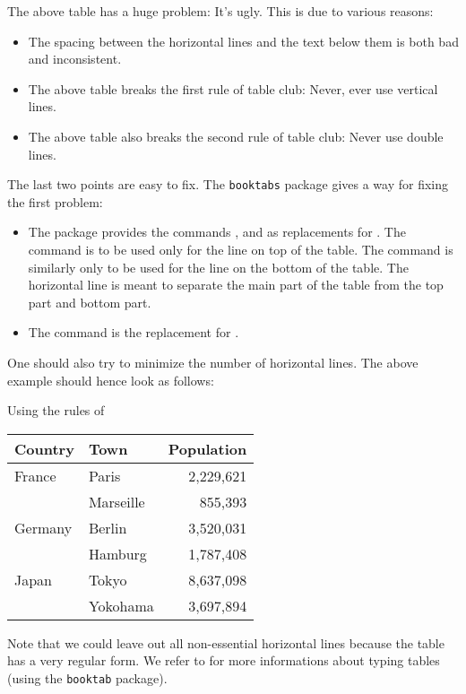 The above table has a huge problem:
It’s ugly.
This is due to various reasons:
\begin{itemize}
  \item
    The spacing between the horizontal lines and the text below them is both bad and inconsistent.
  \item
    The above table breaks the first rule of table club:
    Never, ever use vertical lines.
  \item
    The above table also breaks the second rule of table club:
    Never use double lines.
\end{itemize}
The last two points are easy to fix.
The \texttt{booktabs} package gives a way for fixing the first problem:
\begin{itemize}
  \item
    The package provides the commands ,  and  as replacements for .
    The command  is to be used only for the line on top of the table.
    The command  is similarly only to be used for the line on the bottom of the table.
    The horizontal line  is meant to separate the main part of the table from the top part and bottom part.
  \item
    The command  is the replacement for .
\end{itemize}
One should also try to minimize the number of horizontal lines.
The above example should hence look as follows:
\begin{showlatex}{Using the rules of }
\begin{center}
\begin{tabular}{llr}
  \toprule
  \textbf{Country}  &  \textbf{Town}  & \textbf{Population} \\
  \midrule
  France            & Paris           & 2,229,621           \\
  {}                & Marseille       &   855,393           \\
  Germany           & Berlin          & 3,520,031           \\
  {}                & Hamburg         & 1,787,408           \\
  Japan             & Tokyo           & 8,637,098           \\
  {}                & Yokohama        & 3,697,894           \\
  \bottomrule
\end{tabular}
\end{center}
\end{showlatex}

Note that we could leave out all non-essential horizontal lines because the table has a very regular form.
We refer to \cite{booktab} for more informations about typing tables (using the \texttt{booktab} package).




